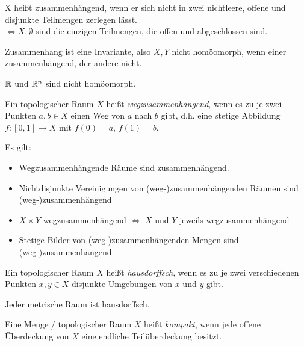 \begin{defi}[Zusammenhang]
  X heißt zusammenhängend, wenn er sich nicht in zwei nichtleere, offene und
  disjunkte Teilmengen zerlegen lässt.\\
  $\Leftrightarrow X, \emptyset$ sind die einzigen Teilmengen, die offen und abgeschlossen sind.
\end{defi}

\begin{bem}
  Zusammenhang ist eine Invariante, also $X, Y$ nicht homöomorph, 
  wenn einer zusammenhängend, der andere nicht.
\end{bem}

\begin{bsp}
  $\mathbb R$ und $\mathbb R^n$ sind nicht homöomorph.
\end{bsp}

\begin{defi}[Wegzusammenhang]
Ein topologischer Raum $X$ heißt \emph{wegzusammenhängend}, 
wenn es zu je zwei Punkten $a, b \in X$ 
einen Weg von $a$ nach $b$ gibt, 
d.h. eine stetige Abbildung $f: [0, 1] \to X$ mit $f(0) = a$, $f(1) = b$.
\end{defi}

\begin{bem} Es gilt:
\begin{itemize}
\item Wegzusammenhängende Räume sind zusammenhängend.
\item Nichtdisjunkte Vereinigungen von (weg-)zusammenhängenden Räumen sind (weg-)zusammenhängend
\item $X \times Y$ wegzusammenhängend $\Leftrightarrow$ $X$ und $Y$ jeweils wegzusammenhängend
\item Stetige Bilder von (weg-)zusammenhängenden Mengen sind (weg-)zusammenhängend. \\
\end{itemize}
\end{bem}


\begin{defi}[Hausdorffsch]
Ein topologischer Raum $X$ heißt \emph{hausdorffsch}, wenn es zu je zwei verschiedenen Punkten $x, y \in X$ disjunkte Umgebungen von $x$ und $y$ gibt.
\end{defi}

\begin{bem} Jeder metrische Raum ist hausdorffsch. \\
\end{bem}

\begin{defi}[Kompaktheit]
Eine Menge / topologischer Raum $X$ heißt \emph{kompakt}, wenn jede offene Überdeckung von $X$ eine endliche Teilüberdeckung besitzt.
\end{defi}

